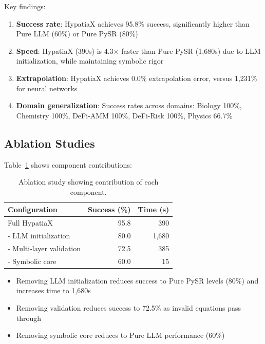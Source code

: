 \documentclass[twoside,11pt]{article}
\begin{document}
Key findings:

\begin{enumerate}
\item \textbf{Success rate}: HypatiaX achieves 95.8\% success, significantly higher than Pure LLM (60\%) or Pure PySR (80\%)

\item \textbf{Speed}: HypatiaX (390s) is 4.3$\times$ faster than Pure PySR (1,680s) due to LLM initialization, while maintaining symbolic rigor

\item \textbf{Extrapolation}: HypatiaX achieves 0.0\% extrapolation error, versus 1,231\% for neural networks

\item \textbf{Domain generalization}: Success rates across domains: Biology 100\%, Chemistry 100\%, DeFi-AMM 100\%, DeFi-Risk 100\%, Physics 66.7\%
\end{enumerate}

\subsection{Ablation Studies}

Table~\ref{tab:ablation} shows component contributions:

\begin{table}[t]
\centering
\caption{Ablation study showing contribution of each component.}
\label{tab:ablation}
\begin{tabular}{lrr}
\toprule
Configuration & Success (\%) & Time (s) \\
\midrule
Full HypatiaX & 95.8 & 390 \\
- LLM initialization & 80.0 & 1,680 \\
- Multi-layer validation & 72.5 & 385 \\
- Symbolic core & 60.0 & 15 \\
\bottomrule
\end{tabular}
\end{table}

\begin{itemize}
\item Removing LLM initialization reduces success to Pure PySR levels (80\%) and increases time to 1,680s
\item Removing validation reduces success to 72.5\% as invalid equations pass through
\item Removing symbolic core reduces to Pure LLM performance (60\%)
\end{itemize}
\end{document}
